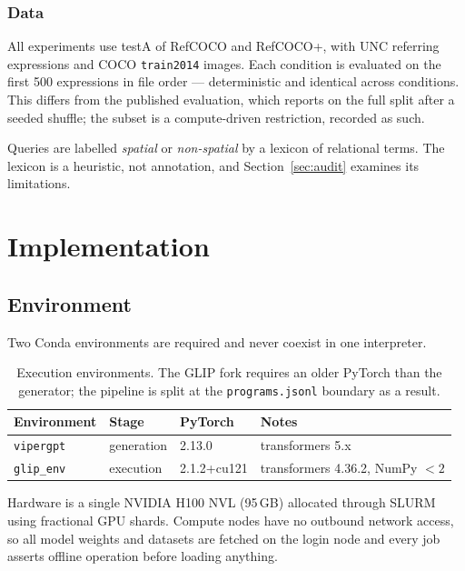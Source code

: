 \documentclass[12pt,a4paper,oneside]{report}
\begin{document}
\subsection{Data}

All experiments use testA of RefCOCO and RefCOCO+, with UNC referring expressions and
COCO \texttt{train2014} images. Each condition is evaluated on the first 500
expressions in file order --- deterministic and identical across conditions. This
differs from the published evaluation, which reports on the full split after a seeded
shuffle; the subset is a compute-driven restriction, recorded as such.

Queries are labelled \emph{spatial} or \emph{non-spatial} by a lexicon of relational
terms. The lexicon is a heuristic, not annotation, and Section~\ref{sec:audit}
examines its limitations.

\chapter{Implementation}
\label{ch:implementation}

\section{Environment}

Two Conda environments are required and never coexist in one interpreter.

\begin{table}[htbp]\centering
\caption{Execution environments. The GLIP fork requires an older PyTorch than the
generator; the pipeline is split at the \texttt{programs.jsonl} boundary as a result.}
\label{tab:envs}
\begin{tabular}{@{}llll@{}}
\toprule
\textbf{Environment} & \textbf{Stage} & \textbf{PyTorch} & \textbf{Notes} \\
\midrule
\texttt{vipergpt} & generation & 2.13.0 & transformers 5.x \\
\texttt{glip\_env} & execution & 2.1.2+cu121 & transformers 4.36.2, NumPy $<2$ \\
\bottomrule
\end{tabular}
\end{table}

Hardware is a single NVIDIA H100 NVL (95\,GB) allocated through SLURM using fractional
GPU shards. Compute nodes have no outbound network access, so all model weights and
datasets are fetched on the login node and every job asserts offline operation before
loading anything.
\end{document}
